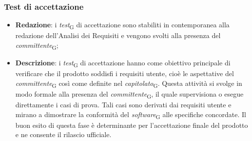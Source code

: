 \subsubsection{Test di accettazione}
\begin{itemize}
    \item \textbf{Redazione}: i \textit{test}\textsubscript{G} di accettazione sono stabiliti in contemporanea alla redazione dell'Analisi dei Requisiti e vengono svolti alla presenza del \textit{committente}\textsubscript{G};
    \item \textbf{Descrizione}: i \textit{test}\textsubscript{G} di accettazione hanno come obiettivo principale di verificare che il prodotto soddisfi i requisiti utente, cioè le aspettative del \textit{committente}\textsubscript{G} così come definite nel \textit{capitolato}\textsubscript{G}. Questa attività si svolge in modo formale alla presenza del \textit{committente}\textsubscript{G}, il quale supervisiona o esegue direttamente i casi di prova. Tali casi sono derivati dai requisiti utente e mirano a dimostrare la conformità del \textit{software}\textsubscript{G} alle specifiche concordate. Il buon esito di questa fase è determinante per l’accettazione finale del prodotto e ne consente il rilascio ufficiale.
\end{itemize}